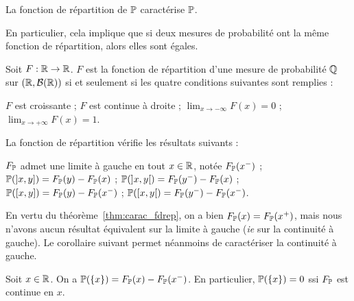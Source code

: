 \documentclass[../integ-proba.tex]{subfiles}
\begin{document}
    \begin{thm}
        La fonction de répartition de $\mathbb{P}$ caractérise $\mathbb{P}$.
    \end{thm}

    \begin{rem}
        En particulier, cela implique que si deux mesures de probabilité ont la même fonction de répartition, alors elles sont égales.
    \end{rem}

    \begin{thm}
        \label{thm:carac_fdrep}
        Soit $F:\mathbb{R} \rightarrow \mathbb{R}$.
        $F$ est la fonction de répartition d'une mesure de probabilité $\mathbb{Q}$ sur $\left( \mathbb{R}, \mathcal{B}(\mathbb{R}) \right)$ si et seulement si les quatre conditions suivantes sont remplies :
        \begin{itemize}
            \itemb $F$ est croissante ;
            \itemb $F$ est continue à droite ;
            \itemb $\lim_{x \to -\infty} F(x) = 0$ ;
            \itemb $\lim_{x \to +\infty} F(x) = 1$.
        \end{itemize}
    \end{thm}

    \begin{prop}
        La fonction de répartition vérifie les résultats suivants :
        \begin{itemize}
            \itemb $F_{\mathbb{P}}$ admet une limite à gauche en tout $x \in \mathbb{R}$, notée $F_{\mathbb{P}}(x^-)$ ;
            \itemb $\mathbb{P}(]x,y]) = F_{\mathbb{P}}(y) - F_{\mathbb{P}}(x)$ ;
            \itemb $\mathbb{P}(]x,y[) = F_{\mathbb{P}}(y^-) - F_{\mathbb{P}}(x)$ ;
            \itemb $\mathbb{P}([x,y]) = F_{\mathbb{P}}(y) - F_{\mathbb{P}}(x^-)$ ;
            \itemb $\mathbb{P}([x,y[) = F_{\mathbb{P}}(y^-) - F_{\mathbb{P}}(x^-)$.
        \end{itemize}
    \end{prop}

    \begin{rem}
        En vertu du théorème~\ref{thm:carac_fdrep}, on a bien $F_{\mathbb{P}}(x) = F_{\mathbb{P}}(x^+)$, mais nous n'avons aucun résultat équivalent sur la limite à gauche (\textit{ie} sur la continuité à gauche).
        Le corollaire suivant permet néanmoins de caractériser la continuité à gauche.
    \end{rem}

    \begin{cor}
        Soit $x \in \mathbb{R}$.
        On a $\mathbb{P}(\left\{x\right\}) = F_{\mathbb{P}}(x) - F_{\mathbb{P}}(x^-)$.
        En particulier, $\mathbb{P}(\left\{x\right\}) = 0$ ssi $F_{\mathbb{P}}$ est continue en $x$.
    \end{cor}
\end{document}
